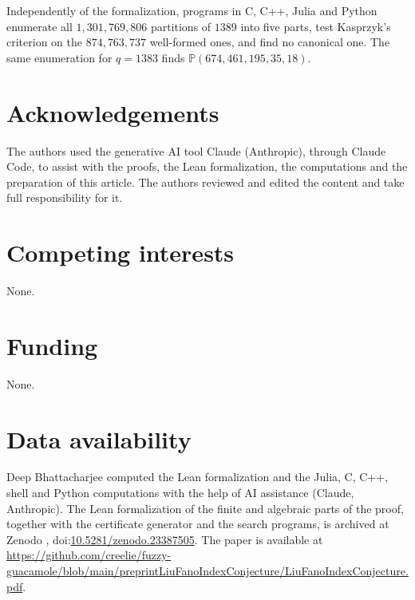 \documentclass{amsart}
\newif\ifanon
\theoremstyle{remark}
\newcommand{\PP}{\mathbb{P}}
\newcommand{\zenodoID}{10.5281/zenodo.23387505}
\newcommand{\preprintURL}{https://github.com/creelie/fuzzy-guacamole/blob/main/preprintLiuFanoIndexConjecture/LiuFanoIndexConjecture.pdf}
\begin{document}
Independently of the formalization, programs in C, C++, Julia and Python enumerate all $1{,}301{,}769{,}806$ partitions of $1389$ into five parts, test Kasprzyk's criterion on the $874{,}763{,}737$ well-formed ones, and find no canonical one. The same enumeration for $q=1383$ finds $\PP(674,461,195,35,18)$.

\section*{Acknowledgements}
The authors used the generative AI tool Claude (Anthropic), through Claude Code, to assist with the proofs, the Lean formalization, the computations and the preparation of this article. The authors reviewed and edited the content and take full responsibility for it.

\section*{Competing interests}
None.

\section*{Funding}
None.

\section*{Data availability}
\begingroup\raggedright
\ifanon
The computations and the Lean formalization were carried out by the authors with the help of AI assistance (Claude, Anthropic). The Lean formalization, the certificate generator and the search programs are supplied with the submission.\par
\else
Deep Bhattacharjee computed the Lean formalization and the Julia, C, C++, shell and Python computations with the help of AI assistance (Claude, Anthropic). The Lean formalization of the finite and algebraic parts of the proof, together with the certificate generator and the search programs, is archived at Zenodo \cite{archive}, doi:\href{https://doi.org/\zenodoID}{\zenodoID}. The paper is available at \url{\preprintURL}.\par
\fi
\endgroup
\end{document}
